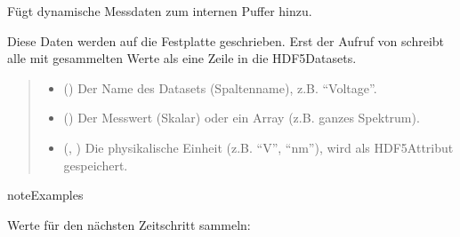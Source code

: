 \documentclass[letterpaper,10pt,english]{sphinxmanual}
\begin{document}
\begin{fulllineitems}
\begin{fulllineitems}
\end{fulllineitems}


\begin{fulllineitems}
\label{\detokenize{modulab/export_manager:modules.export.ExportManager.ExportManager.add}}
\pysigstartsignatures
\pysiglinewithargsret
{}
{\sphinxparamcomma {}\sphinxparamcomma {}}
{}
\pysigstopsignatures
\sphinxAtStartPar
Fügt dynamische Messdaten zum internen Puffer hinzu.

\sphinxAtStartPar
Diese Daten werden  auf die Festplatte geschrieben.
Erst der Aufruf von  schreibt alle mit  gesammelten
Werte als eine Zeile in die HDF5\sphinxhyphen{}Datasets.
\begin{quote}\begin{description}
\begin{itemize}
\item {} 
\sphinxAtStartPar
{} () \textendash{} Der Name des Datasets (Spaltenname), z.B. “Voltage”.

\item {} 
\sphinxAtStartPar
{} () \textendash{} Der Messwert (Skalar) oder ein Array
(z.B. ganzes Spektrum).

\item {} 
\sphinxAtStartPar
{} (, ) \textendash{} Die physikalische Einheit (z.B. “V”, “nm”),
wird als HDF5\sphinxhyphen{}Attribut gespeichert.

\end{itemize}

\end{description}\end{quote}

\begin{sphinxadmonition}{note}{Examples}

\sphinxAtStartPar
Werte für den nächsten Zeitschritt sammeln:


\end{sphinxadmonition}
\end{fulllineitems}
\end{fulllineitems}
\end{document}
